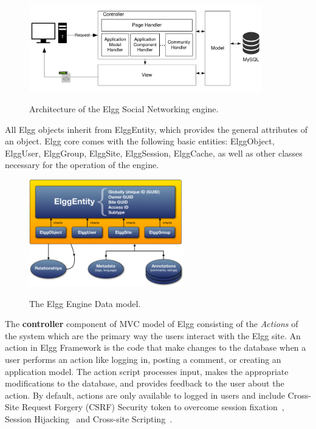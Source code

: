 \begin{figure}[h]
	\caption{Architecture of the Elgg Social Networking engine.}
	\includegraphics[width=0.9\textwidth,natwidth=200,natheight=150]{./fig/elgg_architecture.pdf}
	\centering
	\label{fig:elgg_architecture}
\end{figure}

All Elgg objects inherit from ElggEntity, which provides the general attributes of an object. Elgg core comes with the following basic entities: ElggObject, ElggUser, ElggGroup, ElggSite, ElggSession, ElggCache, as well as other classes necessary for the operation of the engine.

\begin{figure}[h]
	\caption{The Elgg Engine Data model.}
	\includegraphics[width=0.6\textwidth,natwidth=200,natheight=150]{./fig/elgg_data_model.png}
	\centering
	\label{fig:elgg_entities}
\end{figure}

The {\bf controller} component of MVC model of Elgg consisting of the \emph{Actions} of the system which are the primary way the users interact with the Elgg site. An action in Elgg Framework is the code that make changes to the database when a user performs an action like logging in, posting a comment, or creating an application model. The action script processes input, makes the appropriate modifications to the database, and provides feedback to the user about the action. By default, actions are only available to logged in users and include Cross-Site Request Forgery (CSRF) Security token to overcome session fixation~\cite{kolvsek2002session}, Session Hijacking~\cite{burgersposter} and Cross-site Scripting~\cite{thamescomparing}.

